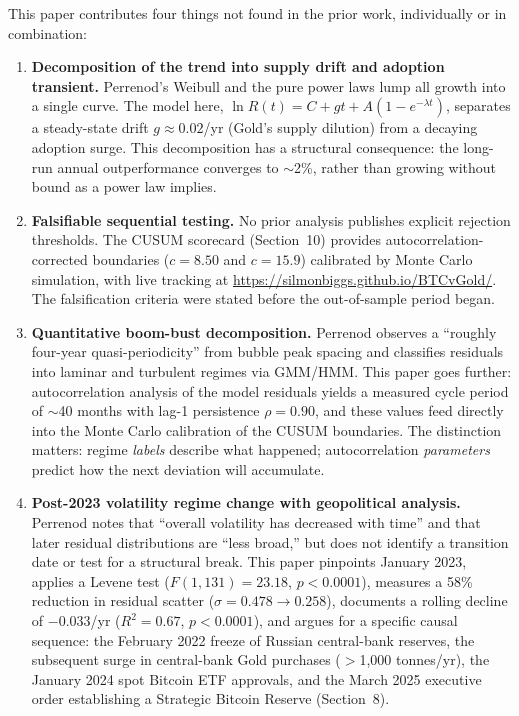 \documentclass[11pt,letterpaper]{article}
\begin{document}
This paper contributes four things not found in the prior work, individually or in combination:

\begin{enumerate}[itemsep=2pt, topsep=4pt]
    \item \textbf{Decomposition of the trend into supply drift and adoption transient.} Perrenod's Weibull and the pure power laws lump all growth into a single curve. The model here, $\ln R(t) = C + gt + A(1 - e^{-\lambda t})$, separates a steady-state drift $g \approx 0.02$/yr (Gold's supply dilution) from a decaying adoption surge. This decomposition has a structural consequence: the long-run annual outperformance converges to $\sim$2\%, rather than growing without bound as a power law implies.

    \item \textbf{Falsifiable sequential testing.} No prior analysis publishes explicit rejection thresholds. The CUSUM scorecard (Section~10) provides autocorrelation-corrected boundaries ($c = 8.50$ and $c = 15.9$) calibrated by Monte Carlo simulation, with live tracking at \url{https://silmonbiggs.github.io/BTCvGold/}. The falsification criteria were stated before the out-of-sample period began.

    \item \textbf{Quantitative boom-bust decomposition.} Perrenod observes a ``roughly four-year quasi-periodicity'' from bubble peak spacing and classifies residuals into laminar and turbulent regimes via GMM/HMM. This paper goes further: autocorrelation analysis of the model residuals yields a measured cycle period of $\sim$40 months with lag-1 persistence $\rho = 0.90$, and these values feed directly into the Monte Carlo calibration of the CUSUM boundaries. The distinction matters: regime \emph{labels} describe what happened; autocorrelation \emph{parameters} predict how the next deviation will accumulate.

    \item \textbf{Post-2023 volatility regime change with geopolitical analysis.} Perrenod notes that ``overall volatility has decreased with time'' and that later residual distributions are ``less broad,'' but does not identify a transition date or test for a structural break. This paper pinpoints January 2023, applies a Levene test ($F(1,131) = 23.18$, $p < 0.0001$), measures a 58\% reduction in residual scatter ($\sigma = 0.478 \to 0.258$), documents a rolling decline of $-0.033$/yr ($R^2 = 0.67$, $p < 0.0001$), and argues for a specific causal sequence: the February 2022 freeze of Russian central-bank reserves, the subsequent surge in central-bank Gold purchases ($>$1{,}000 tonnes/yr), the January 2024 spot Bitcoin ETF approvals, and the March 2025 executive order establishing a Strategic Bitcoin Reserve (Section~8).
\end{enumerate}
\end{document}
